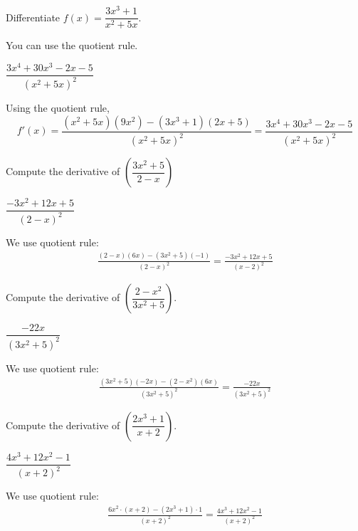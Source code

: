 \begin{question} Differentiate $f(x)=\dfrac{3x^3+1}{x^2+5x}$.
\end{question}
\begin{hint} You can use the quotient rule.
\end{hint}
\begin{answer} $\dfrac{3x^4+30x^3-2x-5}{(x^2+5x)^2}
$
\end{answer}
\begin{solution} Using the quotient rule,
\[f'(x) = \frac{(x^2+5x)(9x^2)-(3x^3+1)(2x+5)}{(x^2+5x)^2}
= \frac{3x^4+30x^3-2x-5}{(x^2+5x)^2}
\]\end{solution}


\begin{question} [2015Q]
Compute the derivative of $\left(\dfrac{3x^2+5}{2-x}\right)$
\end{question}
\begin{answer} $\dfrac{-3x^2+12x+5}{(2-x)^2}$
\end{answer}
\begin{solution}
We use quotient rule:
\begin{align*}
\frac{(2-x)(6x)-(3x^2+5)(-1)}{(2-x)^2}=\frac{-3x^2+12x+5}{(x-2)^2}
\end{align*}
\end{solution}


\begin{question}[2015Q]
Compute the derivative of $\left(\dfrac{2-x^2}{3x^2+5}\right)$.
\end{question}
\begin{answer} $\dfrac{-22x}{(3x^2+5)^2}$
\end{answer}
\begin{solution}
We use quotient rule:
\begin{align*}
\frac{(3x^2+5)(-2x) - (2-x^2)(6x)}{(3x^2+5)^2}=\frac{-22x}{(3x^2+5)^2}
\end{align*}
\end{solution}



\begin{question}[2015Q]
 Compute the derivative of $\left(\dfrac{2x^3+1}{x+2}\right)$.
\end{question}
\begin{answer}
$\dfrac{4x^3+12x^2-1}{(x+2)^2}$
\end{answer}
\begin{solution}
We use quotient rule:
\begin{align*}
\frac{6x^2\cdot (x+2)-(2x^3+1)\cdot 1}{(x+2)^2}=\frac{4x^3+12x^2-1}{(x+2)^2}
\end{align*}
\end{solution}




